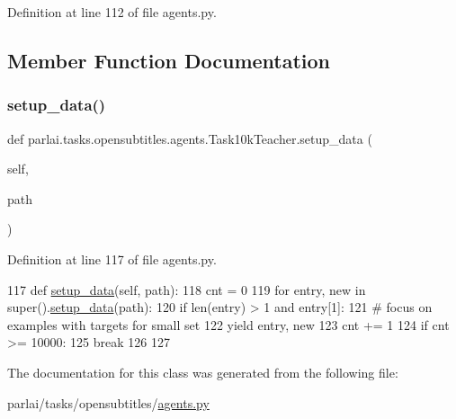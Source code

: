 Definition at line 112 of file agents.\+py.



\subsection{Member Function Documentation}
\mbox{\label{classparlai_1_1tasks_1_1opensubtitles_1_1agents_1_1Task10kTeacher_a2e336eeab89568e9d1bd316e401e9dc1}} 
\subsubsection{\texorpdfstring{setup\+\_\+data()}{setup\_data()}}
{\footnotesize\ttfamily def parlai.\+tasks.\+opensubtitles.\+agents.\+Task10k\+Teacher.\+setup\+\_\+data (\begin{DoxyParamCaption}\item[{}]{self,  }\item[{}]{path }\end{DoxyParamCaption})}



Definition at line 117 of file agents.\+py.


\begin{DoxyCode}
117     \textcolor{keyword}{def }\hyperlink{namespaceparlai_1_1tasks_1_1multinli_1_1agents_a4fa2cb0ba1ed745336ad8bceed36b841}{setup\_data}(self, path):
118         cnt = 0
119         \textcolor{keywordflow}{for} entry, new \textcolor{keywordflow}{in} super().\hyperlink{namespaceparlai_1_1tasks_1_1multinli_1_1agents_a4fa2cb0ba1ed745336ad8bceed36b841}{setup\_data}(path):
120             \textcolor{keywordflow}{if} len(entry) > 1 \textcolor{keywordflow}{and} entry[1]:
121                 \textcolor{comment}{# focus on examples with targets for small set}
122                 \textcolor{keywordflow}{yield} entry, new
123             cnt += 1
124             \textcolor{keywordflow}{if} cnt >= 10000:
125                 \textcolor{keywordflow}{break}
126 
127 
\end{DoxyCode}


The documentation for this class was generated from the following file\+:\begin{DoxyCompactItemize}
\item 
parlai/tasks/opensubtitles/\hyperlink{parlai_2tasks_2opensubtitles_2agents_8py}{agents.\+py}\end{DoxyCompactItemize}
